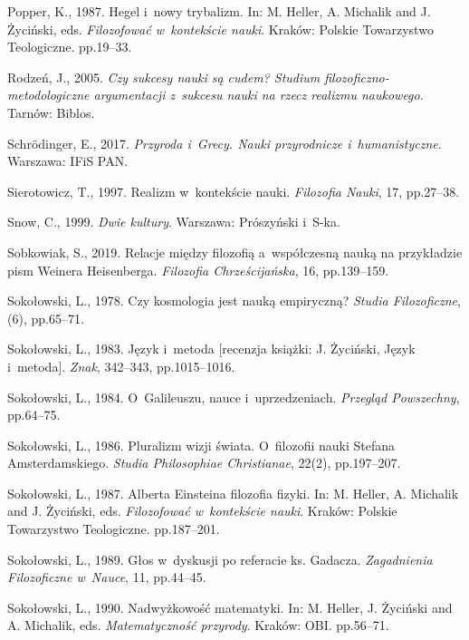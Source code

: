 Popper, K., 1987. Hegel i~nowy trybalizm. In: M. Heller, A. Michalik and J. Życiński, eds. \textit{Filozofować w~kontekście nauki}. Kraków: Polskie Towarzystwo Teologiczne. pp.19–33.



Rodzeń, J., 2005. \textit{Czy sukcesy nauki są cudem? Studium filozoficzno-metodologiczne argumentacji z~sukcesu nauki na rzecz realizmu naukowego}. Tarnów: Biblos.



Schrödinger, E., 2017. \textit{Przyroda i~Grecy. Nauki przyrodnicze i~humanistyczne}. Warszawa: IFiS PAN.



Sierotowicz, T., 1997. Realizm w~kontekście nauki. \textit{Filozofia Nauki}, 17, pp.27–38.



Snow, C., 1999. \textit{Dwie kultury}. Warszawa: Prószyński i~S-ka.



Sobkowiak, S., 2019. Relacje między filozofią a~współczesną nauką na przykładzie pism Weinera Heisenberga. \textit{Filozofia Chrześcijańska}, 16, pp.139–159.



Sokołowski, L., 1978. Czy kosmologia jest nauką empiryczną? \textit{Studia Filozoficzne}, (6), pp.65–71.



Sokołowski, L., 1983. Język i~metoda [recenzja książki: J. Życiński, Język i~metoda]. \textit{Znak}, 342–343, pp.1015–1016.



Sokołowski, L., 1984. O~Galileuszu, nauce i~uprzedzeniach. \textit{Przegląd Powszechny}, pp.64–75.



Sokołowski, L., 1986. Pluralizm wizji świata. O~filozofii nauki Stefana Amsterdamskiego. \textit{Studia Philosophiae Christianae}, 22(2), pp.197–207.



Sokołowski, L., 1987. Alberta Einsteina filozofia fizyki. In: M. Heller, A. Michalik and J. Życiński, eds. \textit{Filozofować w~kontekście nauki}. Kraków: Polskie Towarzystwo Teologiczne. pp.187–201.



Sokołowski, L., 1989. Głos w~dyskusji po referacie ks. Gadacza. \textit{Zagadnienia Filozoficzne w~Nauce}, 11, pp.44–45.



Sokołowski, L., 1990. Nadwyżkowość matematyki. In: M. Heller, J. Życiński and A. Michalik, eds. \textit{Matematyczność przyrody}. Kraków: OBI. pp.56–71.



